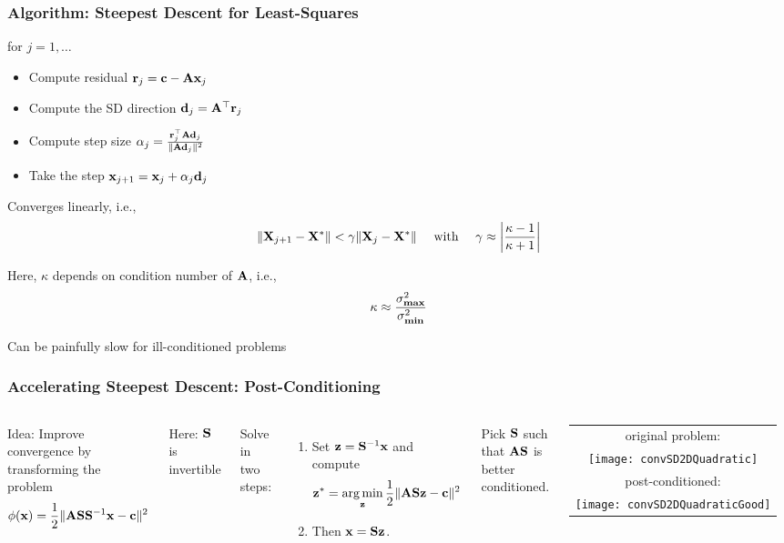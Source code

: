 \documentclass[12pt,fleqn,handout]{beamer}
\begin{document}
\begin{frame}\frametitle{Algorithm: Steepest Descent for Least-Squares}


for $j=1,\ldots $
\begin{itemize}
\item Compute residual ${\bf r}_j = {\bf c} - {\bf A} {\bf x}_j$
\item Compute the SD direction ${\bf d}_j = {\bf A}^{\top}{\bf r}_j$
\item Compute step size  $\alpha_j = {\frac { {\bf r}_j^{\top}{\bf A}{\bf d}_j }{\|{\bf A} {\bf d}_j\|^2}}$
\item Take the step ${\bf x}_{j+1} = {\bf x}_j + \alpha_j {\bf d}_j$
\end{itemize}

\pause

Converges linearly, i.e., 
$$
	\| {\bf X}_{j+1} - {\bf X}^*\| < \gamma \|{\bf X}_j - {\bf X}^* \| \quad \text{ with } \quad \gamma \approx \left| {\frac {\kappa-1}{\kappa+1}} \right|
$$

Here, $\kappa$ depends on condition number of ${\bf A}$, i.e., 
$$ \kappa \approx {\frac {\sigma_{\bf max}^2}{\sigma_{\bf min}^2}} $$


Can be painfully slow for ill-conditioned problems

\end{frame}


\begin{frame}\frametitle{Accelerating Steepest Descent: Post-Conditioning}

\begin{columns}
	
	Idea: Improve convergence by transforming the problem
	 $$ \phi({\bf x}) = {\frac 12} \|{\bf A} {\bf S} {\bf S}^{-1}{\bf x} - {\bf c} \|^2$$
	
	Here: ${\bf S}$ is invertible

	Solve in two steps:
	\begin{enumerate}
		\item Set ${\bf z} = {\bf S}^{-1}{\bf x}$ and compute
	 $$ {\bf z}^*  = \operatorname*{arg\,min}_{{\bf z}} {\frac 12} \|{\bf A} {\bf S} {\bf z} - {\bf c} \|^2$$
	 	\item Then ${\bf x} = {\bf S} {\bf z}$.
	\end{enumerate} 

	 \bigskip

	 Pick ${\bf S}$ such that ${\bf A} {\bf S}$ is better conditioned.

	\pause
	\begin{tabular}{@{}c@{}}
		original problem: \\
		\texttt{[image: convSD2DQuadratic]}\\
		post-conditioned:\\
		\texttt{[image: convSD2DQuadraticGood]} \\
	\end{tabular}
\end{columns}

\end{frame}
\end{document}
